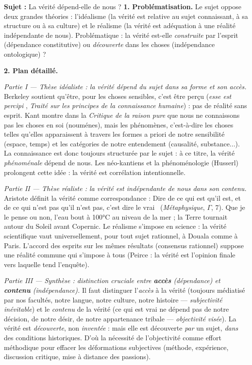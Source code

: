 \documentclass[11pt]{article}
\newcommand{\cle}[1]{{\popxbold\color{popdark}#1}}
\begin{document}
\begin{exoresolu}
\textbf{Sujet :} La vérité dépend-elle de nous ?
\tcblower
\textbf{1. Problématisation.} Le sujet oppose deux grandes théories : l'idéalisme (la vérité est relative au sujet connaissant, à sa structure ou à sa culture) et le réalisme (la vérité est adéquation à une réalité indépendante de nous). Problématique : la vérité est-elle \emph{construite} par l'esprit (dépendance constitutive) ou \emph{découverte} dans les choses (indépendance ontologique) ?

\textbf{2. Plan détaillé.}

\emph{Partie I — Thèse idéaliste : la vérité dépend du sujet dans sa forme et son accès.} Berkeley soutient qu'être, pour les choses sensibles, c'est être perçu (\guillemotleft \emph{esse est percipi} \guillemotright, \emph{Traité sur les principes de la connaissance humaine}) : pas de réalité sans esprit. Kant montre dans la \emph{Critique de la raison pure} que nous ne connaissons pas les choses en soi (nouménes), mais les phénomènes, c'est-à-dire les choses telles qu'elles apparaissent à travers les formes a priori de notre sensibilité (espace, temps) et les catégories de notre entendement (causalité, substance...). La connaissance est donc toujours structurée par le sujet : à ce titre, la vérité \emph{phénoménale} dépend de nous. Les néo-kantiens et la phénoménologie (Husserl) prolongent cette idée : la vérité est corrélation intentionnelle.

\emph{Partie II — Thèse réaliste : la vérité est indépendante de nous dans son contenu.} Aristote définit la vérité comme correspondance : \guillemotleft Dire de ce qui est qu'il est, et de ce qui n'est pas qu'il n'est pas, c'est dire le vrai \guillemotright\ (\emph{Métaphysique}, $\Gamma$, 7). Que je le pense ou non, l'eau bout à 100°C au niveau de la mer ; la Terre tournait autour du Soleil avant Copernic. Le réalisme s'impose en science : la vérité scientifique vaut universellement, pour tout sujet rationnel, à Douala comme à Paris. L'accord des esprits sur les mêmes résultats (consensus rationnel) suppose une réalité commune qui s'impose à tous (Peirce : la vérité est l'opinion finale vers laquelle tend l'enquête).

\emph{Partie III — Synthèse : distinction cruciale entre \textbf{accès} (dépendance) et \textbf{contenu} (indépendance).} Il faut distinguer l'\emph{accès} à la vérité (toujours médiatisé par nos facultés, notre langue, notre culture, notre histoire — \emph{subjectivité inévitable}) et le \emph{contenu} de la vérité (ce qui est vrai ne dépend pas de notre décision, de notre désir, de notre appartenance tribale — \emph{objectivité visée}). La vérité est \emph{découverte}, non \emph{inventée} : mais elle est découverte \emph{par} un sujet, \emph{dans} des conditions historiques. D'où la nécessité de l'\cle{objectivité} comme effort méthodique pour effacer les déformations subjectives (méthode, expérience, discussion critique, mise à distance des passions).


\end{exoresolu}
\end{document}
